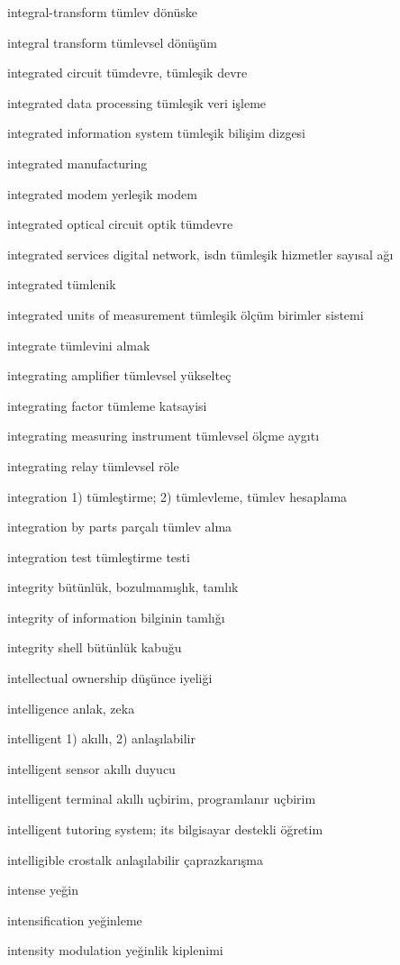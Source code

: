 \documentclass[12pt,fleqn]{article}\usepackage{../../common}
\begin{document}
integral-transform tümlev dönüske

integral transform tümlevsel dönüşüm

integrated circuit tümdevre, tümleşik devre

integrated data processing tümleşik veri işleme

integrated information system tümleşik bilişim dizgesi

integrated manufacturing

integrated modem yerleşik modem

integrated optical circuit optik tümdevre

integrated services digital network, isdn tümleşik hizmetler sayısal ağı

integrated tümlenik

integrated units of measurement tümleşik ölçüm birimler sistemi

integrate tümlevini almak

integrating amplifier tümlevsel yükselteç

integrating factor tümleme katsayisi

integrating measuring instrument tümlevsel ölçme aygıtı

integrating relay tümlevsel röle

integration 1) tümleştirme; 2) tümlevleme, tümlev hesaplama

integration by parts parçalı tümlev alma

integration test tümleştirme testi

integrity bütünlük, bozulmamışlık, tamlık

integrity of information bilginin tamlığı

integrity shell bütünlük kabuğu

intellectual ownership düşünce iyeliği

intelligence anlak, zeka

intelligent 1) akıllı, 2) anlaşılabilir

intelligent sensor akıllı duyucu

intelligent terminal akıllı uçbirim, programlanır uçbirim

intelligent tutoring system; its bilgisayar destekli öğretim

intelligible crostalk anlaşılabilir çaprazkarışma

intense yeğin

intensification yeğinleme

intensity modulation yeğinlik kiplenimi
\end{document}
